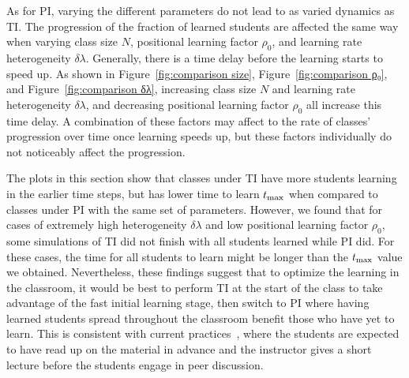 \documentclass[twocolumn,secnumarabic,amssymb, nobibnotes, aps, prd]{revtex4-2}
\begin{document}
    As for PI, varying the different parameters do not lead to as varied dynamics as TI.
    The progression of the fraction of learned students are affected the same way when varying class size $N$, positional learning factor $\rho_0$, and learning rate heterogeneity $\delta\lambda$.
    Generally, there is a time delay before the learning starts to speed up.
    As shown in Figure~\ref{fig:comparison size}, Figure~\ref{fig:comparison ρ₀}, and Figure~\ref{fig:comparison δλ}, increasing class size $N$ and learning rate heterogeneity $\delta\lambda$, and decreasing positional learning factor $\rho_0$ all increase this time delay.
    A combination of these factors may affect to the rate of classes' progression over time once learning speeds up, but these factors individually do not noticeably affect the progression.
    
    The plots in this section show that classes under TI have more students learning in the earlier time steps, but has lower time to learn $t_{\rm max}$ when compared to classes under PI with the same set of parameters.
    However, we found that for cases of extremely high heterogeneity $\delta\lambda$ and low positional learning factor $\rho_0$, some simulations of TI did not finish with all students learned while PI did.
    For these cases, the time for all students to learn might be longer than the $t_{\rm max}$ value we obtained.
    Nevertheless, these findings suggest that to optimize the learning in the classroom, it would be best to perform TI at the start of the class to take advantage of the fast initial learning stage, then switch to PI where having learned students spread throughout the classroom benefit those who have yet to learn.
    This is consistent with current practices~\cite{mazur1997peer,smith2009peer,lasry2008peer,roxas2010seating}, where the students are expected to have read up on the material in advance and the instructor gives a short lecture before the students engage in peer discussion.
\end{document}
